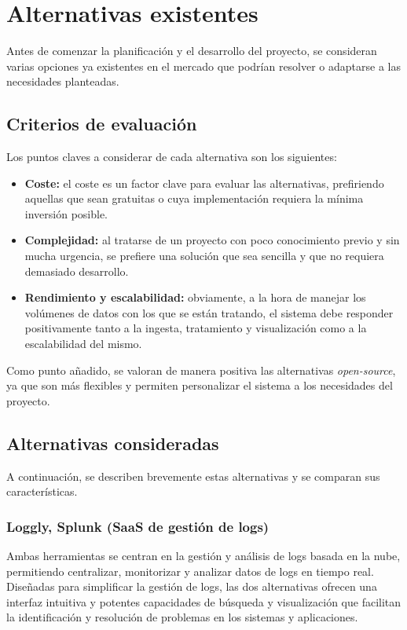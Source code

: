 \section{Alternativas existentes}\label{sec:alternativas}
Antes de comenzar la planificación y el desarrollo del proyecto, se consideran
varias opciones ya existentes en el mercado que podrían resolver o adaptarse a
las necesidades planteadas.

\subsection{Criterios de evaluación}

Los puntos claves a considerar de cada alternativa son los siguientes:
\begin{itemize}
	\item \textbf{Coste:} el coste es un factor clave para evaluar las
		alternativas, prefiriendo aquellas que sean gratuitas o cuya
		implementación requiera la mínima inversión posible.
	\item \textbf{Complejidad:} al tratarse de un proyecto con poco conocimiento
		previo y sin mucha urgencia, se prefiere una solución que sea sencilla y
		que no requiera demasiado desarrollo.
	\item \textbf{Rendimiento y escalabilidad:} obviamente, a la hora de manejar
		los volúmenes de datos con los que se están tratando, el sistema debe
		responder positivamente tanto a la ingesta, tratamiento y visualización
		como a la escalabilidad del mismo.
\end{itemize}

Como punto añadido, se valoran de manera positiva las alternativas
\textit{open-source}, ya que son más flexibles y permiten personalizar el
sistema a los necesidades del proyecto.

\subsection{Alternativas consideradas}
A continuación, se describen brevemente estas alternativas y se comparan sus
características.

\subsubsection{Loggly, Splunk (SaaS de gestión de logs)}
Ambas herramientas se centran en la gestión y análisis de logs basada en la nube,
permitiendo centralizar, monitorizar y analizar datos de logs en tiempo real.
Diseñadas para simplificar la gestión de logs, las dos alternativas ofrecen una
interfaz intuitiva y potentes capacidades de búsqueda y visualización que
facilitan la identificación y resolución de problemas en los sistemas y
aplicaciones.


